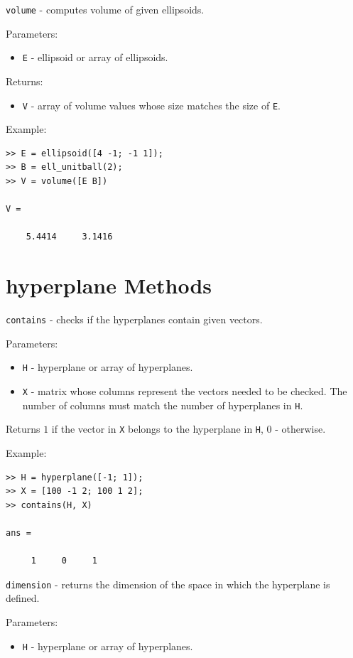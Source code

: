\documentclass{report}
\begin{document}
\newpage

{\Large {\tt volume}} - computes volume of given ellipsoids.

Parameters:
\begin{itemize}
\item {\tt E} - ellipsoid or array of ellipsoids.
\end{itemize}

Returns:
\begin{itemize}
\item {\tt V} - array of volume values whose size matches the size of {\tt E}.
\end{itemize}

Example:
{\tt \begin{verbatim}
>> E = ellipsoid([4 -1; -1 1]);
>> B = ell_unitball(2);
>> V = volume([E B])

V =

    5.4414     3.1416
\end{verbatim} }

\newpage

\section{hyperplane Methods}
{\Large {\tt contains}} - checks if the hyperplanes contain given vectors.

Parameters:
\begin{itemize}
\item {\tt H} - hyperplane or array of hyperplanes.
\item {\tt X} - matrix whose columns represent the vectors needed to be checked.
The number of columns must match the number of hyperplanes in {\tt H}.
\end{itemize}

Returns $1$ if the vector in {\tt X} belongs to the hyperplane in {\tt H},
$0$ - otherwise.

Example:
{\tt \begin{verbatim}
>> H = hyperplane([-1; 1]);
>> X = [100 -1 2; 100 1 2];
>> contains(H, X)

ans =

     1     0     1
\end{verbatim} }

\newpage

{\Large {\tt dimension}} - returns the dimension of the space in which
the hyperplane is defined.

Parameters:
\begin{itemize}
\item {\tt H} - hyperplane or array of hyperplanes.
\end{itemize}
\end{document}
